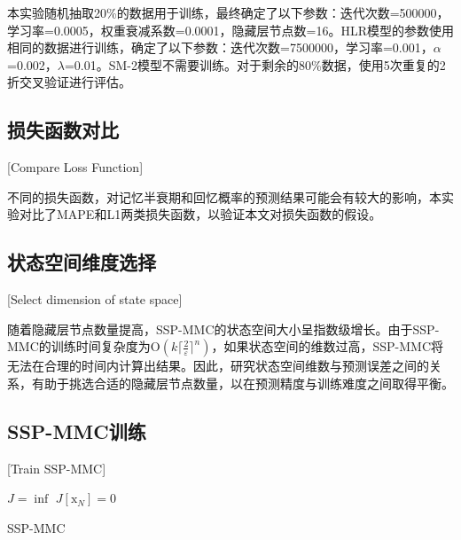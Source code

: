 本实验随机抽取20\%的数据用于训练，最终确定了以下参数：迭代次数=500000，学习率=0.0005，权重衰减系数=0.0001，隐藏层节点数=16。HLR模型的参数使用相同的数据进行训练，确定了以下参数：迭代次数=7500000，学习率=0.001，$\alpha$=0.002，$\lambda$=0.01。SM-2模型不需要训练。对于剩余的80\%数据，使用5次重复的2折交叉验证\cite{dietterichApproximateStatisticalTests1998}进行评估。

\subsection{损失函数对比}[Compare Loss Function]

不同的损失函数，对记忆半衰期和回忆概率的预测结果可能会有较大的影响，本实验对比了MAPE和L1两类损失函数，以验证本文对损失函数的假设。

\subsection{状态空间维度选择}[Select dimension of state space]

随着隐藏层节点数量提高，SSP-MMC的状态空间大小呈指数级增长。由于SSP-MMC的训练时间复杂度为$\mathrm O(k\lceil\frac{2}{\varepsilon}\rceil^n)$，如果状态空间的维数过高，SSP-MMC将无法在合理的时间内计算出结果。因此，研究状态空间维数与预测误差之间的关系，有助于挑选合适的隐藏层节点数量，以在预测精度与训练难度之间取得平衡。

\subsection{SSP-MMC训练}[Train SSP-MMC]

\begin{algorithm}[htbp]
    $J = \inf$\;
    $J[\bm{\mathrm{x}}_{N}] = 0$\;
\caption{SSP-MMC}
\label{alg:ssp_mmc}
\end{algorithm}

